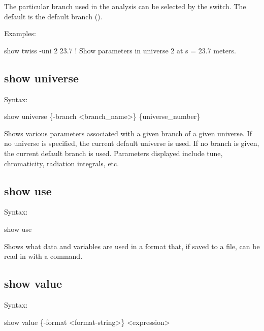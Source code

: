 {{{{{{{{{{The particular branch used in the analysis can be selected by the  switch. The
default is the default branch ().

Examples:
\begin{example}
  show twiss -uni 2 23.7     ! Show parameters in universe 2 at s = 23.7 meters.
\end{example} 


\subsection{show universe}
\label{s:show.universe}

Syntax:
\begin{example}
  show universe \{-branch <branch_name>\} \{universe_number\}
\end{example}

Shows various parameters associated with a given branch of a given universe. If no universe is
specified, the current default universe is used. If no branch is given, the current default branch
is used. Parameters displayed include tune, chromaticity, radiation integrals, etc.


\subsection{show use}
\label{s:show.use}

Syntax:
\begin{example}
  show use
\end{example}

Shows what data and variables are used in a format that, if saved to a file, can be read
in with a  command.


\subsection{show value}
\label{s:show.value}

Syntax:
\begin{example}
  show value \{-format <format-string>\} <expression>
\end{example}

}}}}}}}}}}
